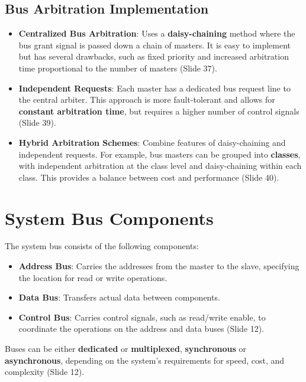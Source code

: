 \documentclass[
  14pt,
  a4paper,
  numbers=noendperiod,
  headinclude=true,
  footinclude=true,
  DIV=calc]{scrreprt}
\begin{document}
\subsection{Bus Arbitration
Implementation}\label{bus-arbitration-implementation}

\begin{itemize}
\item
  \textbf{Centralized Bus Arbitration}: Uses a \textbf{daisy-chaining}
  method where the bus grant signal is passed down a chain of masters.
  It is easy to implement but has several drawbacks, such as fixed
  priority and increased arbitration time proportional to the number of
  masters (Slide 37).
\item
  \textbf{Independent Requests}: Each master has a dedicated bus request
  line to the central arbiter. This approach is more fault-tolerant and
  allows for \textbf{constant arbitration time}, but requires a higher
  number of control signals (Slide 39).
\item
  \textbf{Hybrid Arbitration Schemes}: Combine features of
  daisy-chaining and independent requests. For example, bus masters can
  be grouped into \textbf{classes}, with independent arbitration at the
  class level and daisy-chaining within each class. This provides a
  balance between cost and performance (Slide 40).
\end{itemize}

\section{System Bus Components}\label{system-bus-components}

The system bus consists of the following components:

\begin{itemize}
\item
  \textbf{Address Bus}: Carries the addresses from the master to the
  slave, specifying the location for read or write operations.
\item
  \textbf{Data Bus}: Transfers actual data between components.
\item
  \textbf{Control Bus}: Carries control signals, such as read/write
  enable, to coordinate the operations on the address and data buses
  (Slide 12).
\end{itemize}

Buses can be either \textbf{dedicated} or \textbf{multiplexed},
\textbf{synchronous} or \textbf{asynchronous}, depending on the system's
requirements for speed, cost, and complexity (Slide 12).
\end{document}
